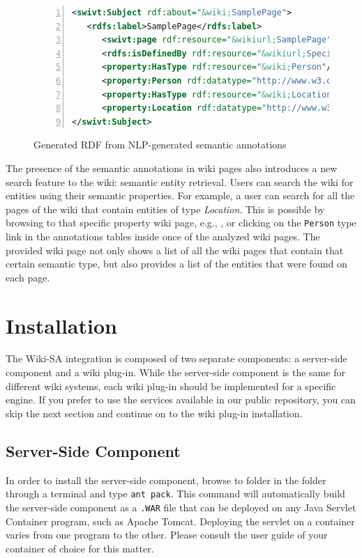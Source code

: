 \begin{figure}[h!]
\centering
\begin{lstlisting}[language=XML,numbers=left,xleftmargin=4mm,columns=flexible]
<swivt:Subject rdf:about="&wiki;SamplePage">
   <rdfs:label>SamplePage</rdfs:label>
      <swivt:page rdf:resource="&wikiurl;SamplePage"/>
      <rdfs:isDefinedBy rdf:resource="&wikiurl;Special:ExportRDF/SamplePage"/>
      <property:HasType rdf:resource="&wiki;Person"/>
      <property:Person rdf:datatype="http://www.w3.org/2001/XMLSchema#string">Mary</property:Person>
      <property:HasType rdf:resource="&wiki;Location"/>
      <property:Location rdf:datatype="http://www.w3.org/2001/XMLSchema#string">Canada</property:Location>
</swivt:Subject>
\end{lstlisting}
\caption{Generated RDF from NLP-generated semantic annotations}
\label{list:smw_rdf}
\end{figure}

The presence of the semantic annotations in wiki pages also introduces a new search feature to the wiki: semantic entity retrieval. Users can search the wiki for entities using their semantic properties. For example, a user can search for all the pages of the wiki that contain entities of type \emph{Location}. This is possible by browsing to that specific property wiki page, e.g., , or clicking on the \texttt{Person} type link in the annotations tables inside once of the analyzed wiki pages. The provided wiki page not only shows a list of all the wiki pages that contain that certain semantic type, but also provides a list of the entities that were found on each page.

\section{Installation}
The Wiki-SA integration is composed of two separate components: a server-side component and a wiki plug-in. While the server-side component is the same for different wiki systems, each wiki plug-in should be implemented for a specific engine. If you prefer to use the services available in our public repository, you can skip the next section and continue on to the wiki plug-in installation.

\subsection{Server-Side Component}
\label{sec:wiki_component}
In order to install the server-side component, browse to  folder in the \sa folder through a terminal and type \texttt{ant pack}. This command will automatically build the server-side component as a \texttt{.WAR} file that can be deployed on any Java Servlet Container program, such as Apache Tomcat. Deploying the servlet on a container varies from one program to the other. Please consult the user guide of your container of choice for this matter.

